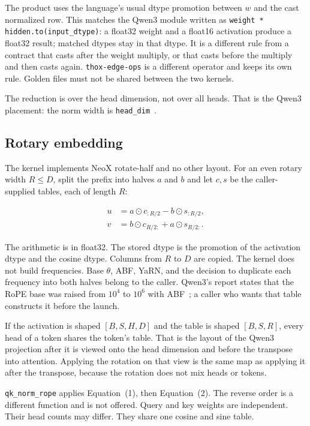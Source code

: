 \documentclass[11pt]{article}
\begin{document}
The product uses the language's usual dtype promotion between \(w\) and the cast normalized row. This matches the Qwen3 module written as \texttt{weight * hidden.to(input\_dtype)}: a float32 weight and a float16 activation produce a float32 result; matched dtypes stay in that dtype. It is a different rule from a contract that casts after the weight multiply, or that casts before the multiply and then casts again. \texttt{thox-edge-ops} is a different operator and keeps its own rule. Golden files must not be shared between the two kernels.

The reduction is over the head dimension, not over all heads. That is the Qwen3 placement: the norm width is \texttt{head\_dim}~\cite{qwen3}.

\subsection{Rotary embedding}

The kernel implements NeoX rotate-half and no other layout. For an even rotary width \(R \le D\), split the prefix into halves \(a\) and \(b\) and let \(c, s\) be the caller-supplied tables, each of length \(R\):

\begin{equation}
\begin{aligned}
u &= a \odot c_{:R/2} - b \odot s_{:R/2}, \\
v &= b \odot c_{R/2:} + a \odot s_{R/2:}.
\end{aligned}
\end{equation}

The arithmetic is in float32. The stored dtype is the promotion of the activation dtype and the cosine dtype. Columns from \(R\) to \(D\) are copied. The kernel does not build frequencies. Base \(\theta\), ABF, YaRN, and the decision to duplicate each frequency into both halves belong to the caller. Qwen3's report states that the RoPE base was raised from \(10^{4}\) to \(10^{6}\) with ABF~\cite{qwen3}; a caller who wants that table constructs it before the launch.

If the activation is shaped \([B, S, H, D]\) and the table is shaped \([B, S, R]\), every head of a token shares the token's table. That is the layout of the Qwen3 projection after it is viewed onto the head dimension and before the transpose into attention. Applying the rotation on that view is the same map as applying it after the transpose, because the rotation does not mix heads or tokens.

\texttt{qk\_norm\_rope} applies Equation~(1), then Equation~(2). The reverse order is a different function and is not offered. Query and key weights are independent. Their head counts may differ. They share one cosine and sine table.
\end{document}
